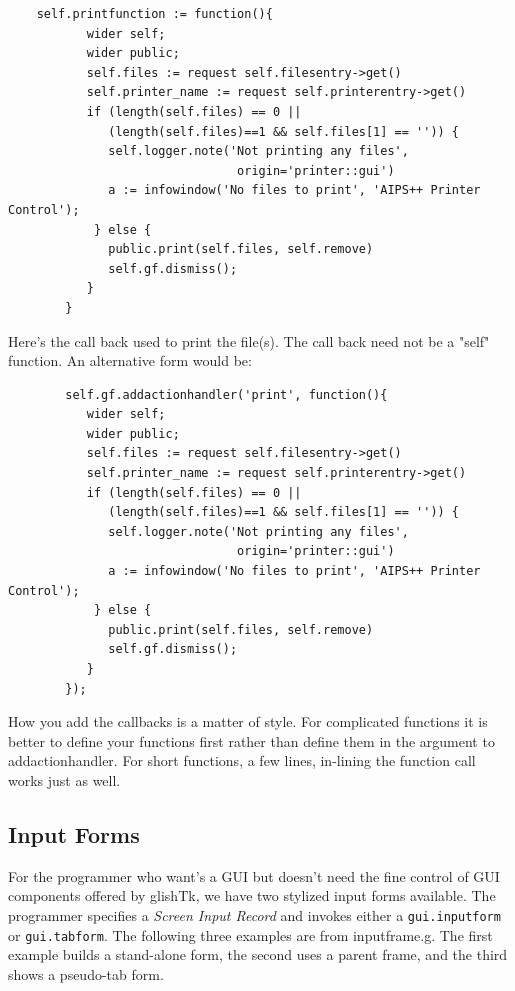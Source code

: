 \begin{verbatim}
    self.printfunction := function(){
           wider self; 
           wider public;
           self.files := request self.filesentry->get()
           self.printer_name := request self.printerentry->get()
           if (length(self.files) == 0 ||
              (length(self.files)==1 && self.files[1] == '')) {
              self.logger.note('Not printing any files',
                                origin='printer::gui')
              a := infowindow('No files to print', 'AIPS++ Printer Control');
            } else {
              public.print(self.files, self.remove)
              self.gf.dismiss();
           }
        }
\end{verbatim}

Here's the call back used to print the file(s). The call back need
not be a "self" function.  An alternative form would be:

\begin{verbatim}
        self.gf.addactionhandler('print', function(){
           wider self; 
           wider public;
           self.files := request self.filesentry->get()
           self.printer_name := request self.printerentry->get()
           if (length(self.files) == 0 ||
              (length(self.files)==1 && self.files[1] == '')) {
              self.logger.note('Not printing any files',
                                origin='printer::gui')
              a := infowindow('No files to print', 'AIPS++ Printer Control');
            } else {
              public.print(self.files, self.remove)
              self.gf.dismiss();
           }
        });
\end{verbatim}

How you add the callbacks is a matter of style.  For complicated functions
it is better to define your functions first
rather than define them in the argument to addactionhandler. For short
functions, a few lines, in-lining the function call works just as well.

\subsection{Input Forms}
For the programmer who want's a GUI but doesn't need the fine control of GUI 
components offered by glishTk, we have two stylized input forms available.
The programmer specifies a \textit{Screen Input Record} and invokes either a
\texttt{gui.inputform} or \texttt{gui.tabform}.  The following three examples
are from inputframe.g.  The first example builds a stand-alone form, the second
uses a parent frame, and the third shows a pseudo-tab form.

